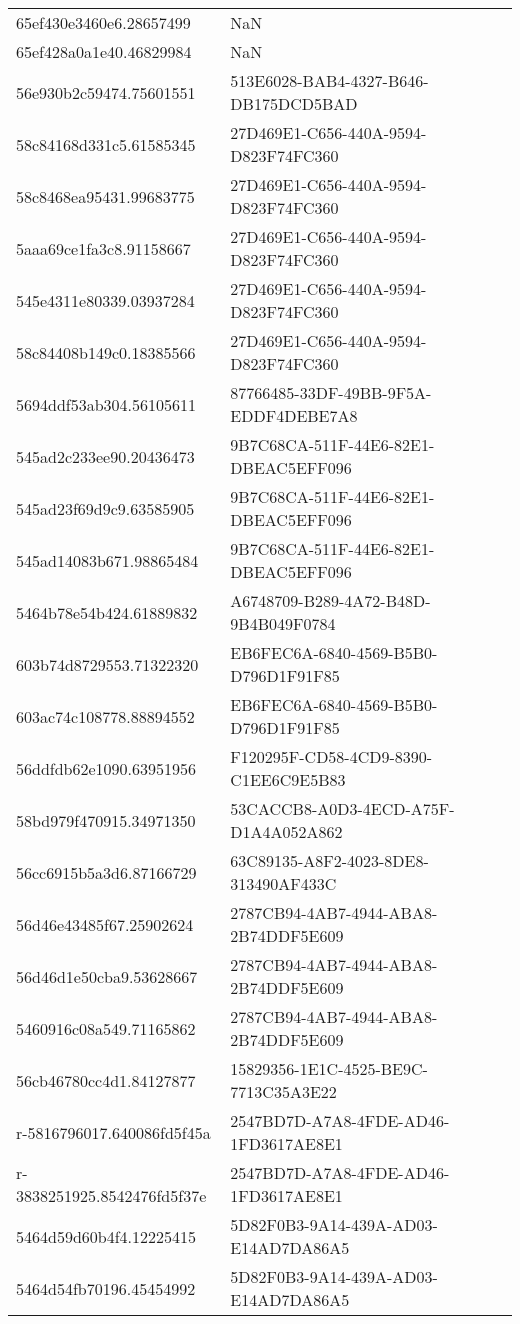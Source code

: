 \begin{tabular}{ll}
65ef430e3460e6.28657499 & NaN \\
65ef428a0a1e40.46829984 & NaN \\
56e930b2c59474.75601551 & 513E6028-BAB4-4327-B646-DB175DCD5BAD \\
58c84168d331c5.61585345 & 27D469E1-C656-440A-9594-D823F74FC360 \\
58c8468ea95431.99683775 & 27D469E1-C656-440A-9594-D823F74FC360 \\
5aaa69ce1fa3c8.91158667 & 27D469E1-C656-440A-9594-D823F74FC360 \\
545e4311e80339.03937284 & 27D469E1-C656-440A-9594-D823F74FC360 \\
58c84408b149c0.18385566 & 27D469E1-C656-440A-9594-D823F74FC360 \\
5694ddf53ab304.56105611 & 87766485-33DF-49BB-9F5A-EDDF4DEBE7A8 \\
545ad2c233ee90.20436473 & 9B7C68CA-511F-44E6-82E1-DBEAC5EFF096 \\
545ad23f69d9c9.63585905 & 9B7C68CA-511F-44E6-82E1-DBEAC5EFF096 \\
545ad14083b671.98865484 & 9B7C68CA-511F-44E6-82E1-DBEAC5EFF096 \\
5464b78e54b424.61889832 & A6748709-B289-4A72-B48D-9B4B049F0784 \\
603b74d8729553.71322320 & EB6FEC6A-6840-4569-B5B0-D796D1F91F85 \\
603ac74c108778.88894552 & EB6FEC6A-6840-4569-B5B0-D796D1F91F85 \\
56ddfdb62e1090.63951956 & F120295F-CD58-4CD9-8390-C1EE6C9E5B83 \\
58bd979f470915.34971350 & 53CACCB8-A0D3-4ECD-A75F-D1A4A052A862 \\
56cc6915b5a3d6.87166729 & 63C89135-A8F2-4023-8DE8-313490AF433C \\
56d46e43485f67.25902624 & 2787CB94-4AB7-4944-ABA8-2B74DDF5E609 \\
56d46d1e50cba9.53628667 & 2787CB94-4AB7-4944-ABA8-2B74DDF5E609 \\
5460916c08a549.71165862 & 2787CB94-4AB7-4944-ABA8-2B74DDF5E609 \\
56cb46780cc4d1.84127877 & 15829356-1E1C-4525-BE9C-7713C35A3E22 \\
r-5816796017.640086fd5f45a & 2547BD7D-A7A8-4FDE-AD46-1FD3617AE8E1 \\
r-3838251925.8542476fd5f37e & 2547BD7D-A7A8-4FDE-AD46-1FD3617AE8E1 \\
5464d59d60b4f4.12225415 & 5D82F0B3-9A14-439A-AD03-E14AD7DA86A5 \\
5464d54fb70196.45454992 & 5D82F0B3-9A14-439A-AD03-E14AD7DA86A5 \\

\end{tabular}
